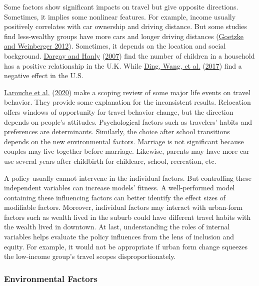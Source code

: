 \documentclass[
  12pt,
]{article}
\begin{document}
Some factors show significant impacts on travel but give opposite directions. Sometimes, it implies some nonlinear features. For example, income usually positively correlates with car ownership and driving distance. But some studies find less-wealthy groups have more cars and longer driving distances (\protect\hyperlink{ref-goetzkeSeparatingContextualEndogenous2012}{Goetzke and Weinberger 2012}). Sometimes, it depends on the location and social background. \protect\hyperlink{ref-dargayVolatilityCarOwnership2007}{Dargay and Hanly} (\protect\hyperlink{ref-dargayVolatilityCarOwnership2007}{2007}) find the number of children in a household has a positive relationship in the U.K. While \protect\hyperlink{ref-dingExploringInfluenceBuilt2017}{Ding, Wang, et al.} (\protect\hyperlink{ref-dingExploringInfluenceBuilt2017}{2017}) find a negative effect in the U.S.

\protect\hyperlink{ref-laroucheEffectMajorLife2020}{Larouche et al.} (\protect\hyperlink{ref-laroucheEffectMajorLife2020}{2020}) make a scoping review of some major life events on travel behavior. They provide some explanation for the inconsistent results. Relocation offers windows of opportunity for travel behavior change, but the direction depends on people's attitudes. Psychological factors such as travelers' habits and preferences are determinants. Similarly, the choice after school transitions depends on the new environmental factors. Marriage is not significant because couples may live together before marriage. Likewise, parents may have more car use several years after childbirth for childcare, school, recreation, etc.

A policy usually cannot intervene in the individual factors. But controlling these independent variables can increase models' fitness. A well-performed model containing these influencing factors can better identify the effect sizes of modifiable factors. Moreover, individual factors may interact with urban-form factors such as wealth lived in the suburb could have different travel habits with the wealth lived in downtown. At last, understanding the roles of internal variables helps evaluate the policy influences from the lens of inclusion and equity. For example, it would not be appropriate if urban form change squeezes the low-income group's travel scopes disproportionately.

\hypertarget{environmental-factors}{%
\subsubsection{Environmental Factors}\label{environmental-factors}}
\end{document}
